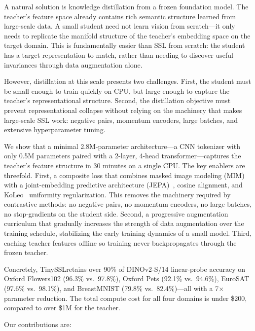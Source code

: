 \documentclass{article}
\newcommand{\method}{TinySSL}
\begin{document}
A natural solution is knowledge distillation from a frozen foundation model. The teacher's feature space already contains rich semantic structure learned from large-scale data. A small student need not learn vision from scratch---it only needs to replicate the manifold structure of the teacher's embedding space on the target domain. This is fundamentally easier than SSL from scratch: the student has a target representation to match, rather than needing to discover useful invariances through data augmentation alone.

However, distillation at this scale presents two challenges. First, the student must be small enough to train quickly on CPU, but large enough to capture the teacher's representational structure. Second, the distillation objective must prevent representational collapse without relying on the machinery that makes large-scale SSL work: negative pairs, momentum encoders, large batches, and extensive hyperparameter tuning.

We show that a minimal 2.8M-parameter architecture---a CNN tokenizer with only 0.5M parameters paired with a 2-layer, 4-head transformer---captures the teacher's feature structure in 30 minutes on a single CPU. The key enablers are threefold. First, a composite loss that combines masked image modeling (MIM) with a joint-embedding predictive architecture (JEPA)~\cite{jepa}, cosine alignment, and KoLeo~\cite{koleo} uniformity regularization. This removes the machinery required by contrastive methods: no negative pairs, no momentum encoders, no large batches, no stop-gradients on the student side. Second, a progressive augmentation curriculum that gradually increases the strength of data augmentation over the training schedule, stabilizing the early training dynamics of a small model. Third, caching teacher features offline so training never backpropagates through the frozen teacher.

Concretely, \method retains over 90\% of DINOv2-S/14 linear-probe accuracy on Oxford Flowers102 (96.3\% vs.\ 97.8\%), Oxford Pets (92.1\% vs.\ 94.6\%), EuroSAT (97.6\% vs.\ 98.1\%), and BreastMNIST (79.8\% vs.\ 82.4\%)---all with a 7$\times$ parameter reduction. The total compute cost for all four domains is under \$200, compared to over \$1M for the teacher.

Our contributions are:
\end{document}
